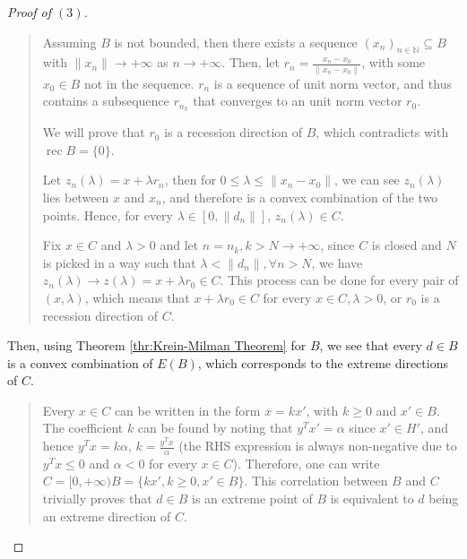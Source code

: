 \begin{proof}[Proof of \( (3) \)]
  \begin{quote}
    Assuming \( B \) is not bounded, then there exists a sequence \( (x_{n})_{n
    \in \mathbb{N}} \subseteq B \) with \( \|x_{n}\| \to  +\infty \) as \( n
    \to +\infty \). Then, let \( r_{n} = \frac{x_{n} - x_{0}}{\|x_{n}-x_{0}\|}
    \), with some \( x_{0} \in B \) not in the sequence. \( r_{n} \) is a
    sequence of unit norm vector, and thus contains a subsequence \( r_{n_{k}}
    \) that converges to an unit norm vector \( r_{0} \).

    We will prove that \( r_{0} \) is a recession direction of \( B \), which
    contradicts with \( \operatorname{rec} B = \{0\}   \).

    Let \( z_{n}(\lambda) = x + \lambda r_{n} \), then for \( 0 \le  \lambda \le
    \|x_{n} - x_{0}\|\), we can see \( z_{n}(\lambda) \) lies between \( x \)
    and \( x_{n} \), and therefore is a convex combination of the two points.
    Hence, for every \( \lambda \in [0, \|d_{n}\|] \), \( z_{n}(\lambda) \in C
    \).

    Fix \( x \in C \) and \( \lambda > 0 \) and
    let \( n = n_{k}, k > N \to +\infty \), since
    \( C \) is closed and \( N \) is picked in a way such that \( \lambda <
    \|d_{n}\|, \forall n > N \), we have \( z_{n}(\lambda) \to z(\lambda) = x +
    \lambda r_{0} \in C\). This process can be done for every pair of \( (x,
    \lambda) \), which means that \( x + \lambda r_{0} \in C \) for every \( x
    \in C, \lambda > 0 \), or \( r_{0} \) is a recession direction of \( C \).
  \end{quote}

  Then, using Theorem \ref{thr:Krein-Milman Theorem} for \( B \), we see that
  every \( d \in B \) is a convex combination of \( E(B) \), which corresponds
  to the extreme directions of \( C \).

  \begin{quote}
    Every \( x \in C \) can be written in the form \( x = kx' \), with \( k \ge
    0\) and \( x' \in B \). The coefficient \( k \) can be found by noting that
    \( y^{T}x' = \alpha \) since \( x' \in H' \), and hence \( y^{T}x = k\alpha
    \), \( k = \frac{y^{T}x}{\alpha} \) (the RHS expression is always
    non-negative due to \( y^{T}x \le  0 \) and \( \alpha < 0 \) for every \( x \in
    C\)). Therefore, one can write \( C = [0,
    +\infty) B = \{kx', k \ge 0, x' \in B\}   \). This correlation between \( B
    \) and \( C \) trivially
    proves that \( d \in B \) is an extreme point of \( B \) is equivalent to \(
    d\) being an extreme direction of \( C \).
  \end{quote}


\end{proof}
